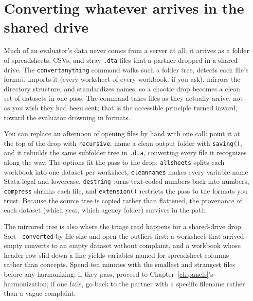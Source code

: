 \documentclass[
    a4paper,
    fontsize=10pt,
    twoside=true,
    numbers=noenddot,
]{kaobook}
\begin{document}
\section{Converting whatever arrives in the shared drive}
Much of an evaluator's data never comes from a server at all; it arrives as a folder of spreadsheets, CSVs, and stray \texttt{.dta} files that a partner dropped in a shared drive. The \texttt{convertanything} command walks such a folder tree, detects each file's format, imports it (every worksheet of every workbook, if you ask), mirrors the directory structure, and standardizes names, so a chaotic drop becomes a clean set of datasets in one pass. The command takes files as they actually arrive, not as you wish they had been sent; that is the accessible principle turned inward, toward the evaluator drowning in formats.

You can replace an afternoon of opening files by hand with one call: point it at the top of the drop with \texttt{recursive}, name a clean output folder with \texttt{saving()}, and it rebuilds the same subfolder tree in \texttt{.dta}, converting every file it recognizes along the way. The options fit the pass to the drop: \texttt{allsheets} splits each workbook into one dataset per worksheet, \texttt{cleannames} makes every variable name Stata-legal and lowercase, \texttt{destring} turns text-coded numbers back into numbers, \texttt{compress} shrinks each file, and \texttt{extension()} restricts the pass to the formats you trust. Because the source tree is copied rather than flattened, the provenance of each dataset (which year, which agency folder) survives in the path.

The mirrored tree is also where the triage read happens for a shared-drive drop. Sort \texttt{\_converted} by file size and open the outliers first: a worksheet that arrived empty converts to an empty dataset without complaint, and a workbook whose header row slid down a line yields variables named for spreadsheet columns rather than concepts. Spend ten minutes with the smallest and strangest files before any harmonizing: if they pass, proceed to Chapter~\ref{ch:panels}'s harmonization; if one fails, go back to the partner with a specific filename rather than a vague complaint.
\end{document}
